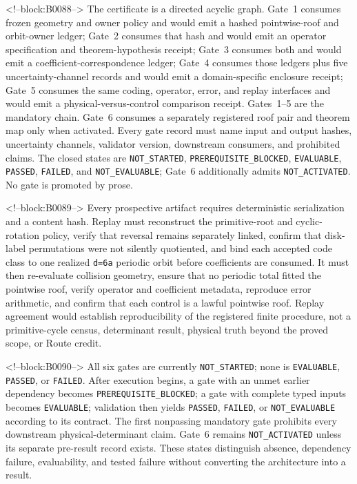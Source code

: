 \documentclass[11pt,a4paper]{article}
\begin{document}
<!--block:B0088-->
The certificate is a directed acyclic graph. Gate~1 consumes frozen geometry and owner policy and would emit a hashed pointwise-roof and orbit-owner ledger; Gate~2 consumes that hash and would emit an operator specification and theorem-hypothesis receipt; Gate~3 consumes both and would emit a coefficient-correspondence ledger; Gate~4 consumes those ledgers plus five uncertainty-channel records and would emit a domain-specific enclosure receipt; Gate~5 consumes the same coding, operator, error, and replay interfaces and would emit a physical-versus-control comparison receipt. Gates~1--5 are the mandatory chain. Gate~6 consumes a separately registered roof pair and theorem map only when activated. Every gate record must name input and output hashes, uncertainty channels, validator version, downstream consumers, and prohibited claims. The closed states are \texttt{NOT\_STARTED}, \texttt{PREREQUISITE\_BLOCKED}, \texttt{EVALUABLE}, \texttt{PASSED}, \texttt{FAILED}, and \texttt{NOT\_EVALUABLE}; Gate~6 additionally admits \texttt{NOT\_ACTIVATED}. No gate is promoted by prose.

<!--block:B0089-->
Every prospective artifact requires deterministic serialization and a content hash. Replay must reconstruct the primitive-root and cyclic-rotation policy, verify that reversal remains separately linked, confirm that disk-label permutations were not silently quotiented, and bind each accepted code class to one realized \texttt{d=6a} periodic orbit before coefficients are consumed. It must then re-evaluate collision geometry, ensure that no periodic total fitted the pointwise roof, verify operator and coefficient metadata, reproduce error arithmetic, and confirm that each control is a lawful pointwise roof. Replay agreement would establish reproducibility of the registered finite procedure, not a primitive-cycle census, determinant result, physical truth beyond the proved scope, or Route credit.

<!--block:B0090-->
All six gates are currently \texttt{NOT\_STARTED}; none is \texttt{EVALUABLE}, \texttt{PASSED}, or \texttt{FAILED}. After execution begins, a gate with an unmet earlier dependency becomes \texttt{PREREQUISITE\_BLOCKED}; a gate with complete typed inputs becomes \texttt{EVALUABLE}; validation then yields \texttt{PASSED}, \texttt{FAILED}, or \texttt{NOT\_EVALUABLE} according to its contract. The first nonpassing mandatory gate prohibits every downstream physical-determinant claim. Gate~6 remains \texttt{NOT\_ACTIVATED} unless its separate pre-result record exists. These states distinguish absence, dependency failure, evaluability, and tested failure without converting the architecture into a result.
\end{document}
